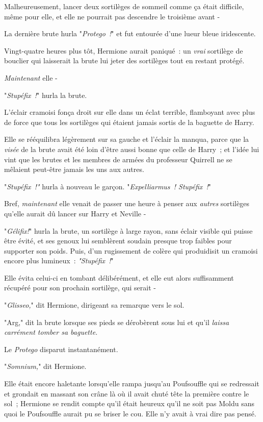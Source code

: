 Malheureusement, lancer deux sortilèges de sommeil comme ça était difficile, même pour elle, et elle ne pourrait pas descendre le troisième avant -

La dernière brute hurla "\emph{Protego~!}" et fut entourée d'une lueur bleue iridescente.

Vingt-quatre heures plus tôt, Hermione aurait paniqué~: un \emph{vrai} sortilège de bouclier qui laisserait la brute lui jeter des sortilèges tout en restant protégé.

\emph{Maintenant} elle -

"\emph{Stupéfix~!}" hurla la brute.

L'éclair cramoisi fonça droit sur elle dans un éclat terrible, flamboyant avec plus de force que tous les sortilèges qui étaient jamais sortis de la baguette de Harry.

Elle se rééquilibra légèrement sur sa gauche et l'éclair la manqua, parce que la \emph{visée} de la brute avait été loin d'être aussi bonne que celle de Harry~; et l'idée lui vint que les brutes et les membres de armées du professeur Quirrell ne se mêlaient peut-être jamais les uns aux autres.

"\emph{Stupéfix~!"} hurla à nouveau le garçon. "\emph{Expelliarmus~! Stupéfix~!}"

Bref, \emph{maintenant} elle venait de passer une heure à penser aux \emph{autres} sortilèges qu'elle aurait dû lancer sur Harry et Neville -

"\emph{Gélifix!}" hurla la brute, un sortilège à large rayon, sans éclair visible qui puisse être évité, et ses genoux lui semblèrent soudain presque trop faibles pour supporter son poids. Puis, d'un rugissement de colère qui produidisit un cramoisi encore plus lumineux~: \emph{"Stupéfix~!}"

Elle évita celui-ci en tombant délibérément, et elle eut alors suffisamment récupéré pour son prochain sortilège, qui serait -

"\emph{Glisseo,}" dit Hermione, dirigeant sa remarque vers le sol.

"Arg," dit la brute lorsque ses pieds se dérobèrent sous lui et qu'il \emph{laissa carrément tomber sa baguette.}

Le \emph{Protego} disparut instantanément.

"\emph{Somnium,}" dit Hermione.

Elle était encore haletante lorsqu'elle rampa jusqu'au Poufsouffle qui se redressait et grondait en massant son crâne là où il avait chuté tête la première contre le sol~; Hermione se rendit compte qu'il était heureux qu'il ne soit pas Moldu sans quoi le Poufsouffle aurait pu se briser le cou. Elle n'y avait à vrai dire pas pensé.

